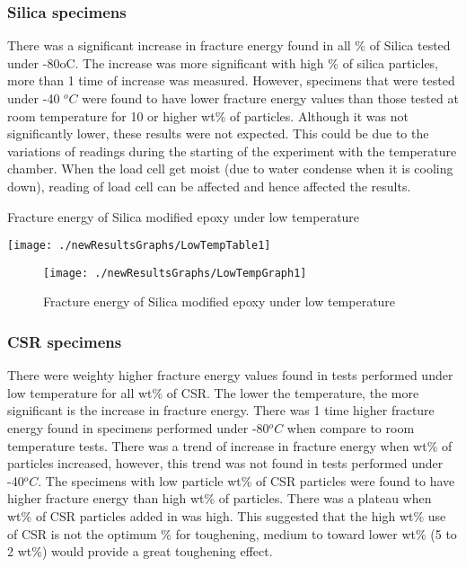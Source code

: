 \documentclass[numbers=noendperiod,chapterprefix=on]{icldt} %
\begin{document}
\subsubsection{Silica specimens}
There was a significant increase in fracture energy found in all \% of Silica tested under -80oC. The increase was more significant with high \% of silica particles, more than 1 time of increase was measured. However, specimens that were tested under -40 $^oC$ were found to have lower fracture energy values than those tested at room temperature for 10 or higher wt\% of particles. Although it was not significantly lower, these results were not expected. This could be due to the variations of readings during the starting of the experiment with the temperature chamber. When the load cell get moist (due to water condense when it is cooling down), reading of load cell can be affected and hence affected the results.

\begin{table}[!hp]
\centering
\caption{Fracture energy of Silica modified epoxy under low temperature} %
\texttt{[image: ./newResultsGraphs/LowTempTable1]}
\end{table}
\FloatBarrier
\begin{figure}[!hp]
\centering
\texttt{[image: ./newResultsGraphs/LowTempGraph1]}
\caption{Fracture energy of Silica modified epoxy under low temperature}
\end{figure}
\FloatBarrier

\subsubsection{CSR specimens}
There were weighty higher fracture energy values found in tests performed under low temperature for all wt\% of CSR. The lower the temperature, the more significant is the increase in fracture energy. There was 1 time higher fracture energy found in specimens performed under -80$^oC$ when compare to room temperature tests. There was a trend of increase in fracture energy when wt\% of particles increased, however, this trend was not found in tests performed under -40$^oC$. The specimens with low particle wt\% of CSR particles were found to have higher fracture energy than high wt\% of particles. There was a plateau when wt\% of CSR particles added in was high. This suggested that the high wt\% use of CSR is not the optimum \% for toughening, medium to toward lower wt\% (5 to 2 wt\%) would provide a great toughening effect.
\end{document}
